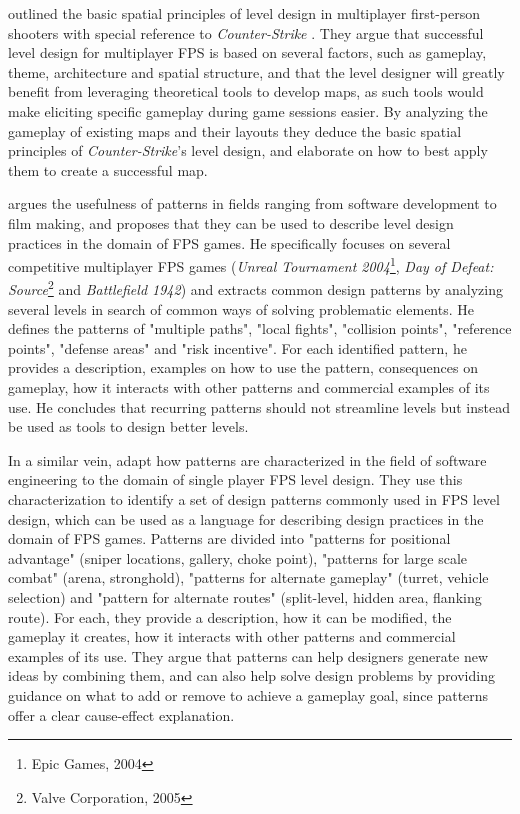 \documentclass{Configuration_Files/PoliMi3i_thesis}
\begin{document}
 outlined the basic spatial principles of level design in multiplayer first-person shooters with special reference to \textit{Counter-Strike} \cite{guttler_spatial_2003}. They argue  that successful level design for multiplayer FPS is based on several factors, such as gameplay, theme, architecture and spatial structure, and that the level designer will greatly benefit from leveraging theoretical tools to develop maps, as such tools would make  eliciting specific gameplay during game sessions easier. By analyzing the gameplay of existing maps and their layouts they deduce the basic spatial principles of \textit{Counter-Strike}'s level design, and elaborate on how to best apply them to create a successful map. 

 argues the usefulness of patterns in fields ranging from software development to film making, and proposes that they can be used to describe level design practices in the domain of FPS games. He specifically focuses on several competitive multiplayer FPS games (\textit{Unreal Tournament 2004}\footnote{Epic Games, 2004}, \textit{Day of Defeat: Source}\footnote{Valve Corporation, 2005} and \textit{Battlefield 1942}) and extracts common design patterns by analyzing several levels in search of common ways of solving problematic elements. He defines the patterns of "multiple paths", "local fights", "collision points", "reference points", "defense areas" and "risk incentive". For each identified pattern, he provides a description, examples on how to use the pattern, consequences on gameplay, how it interacts with other patterns and commercial examples of its use. He concludes that recurring patterns should not streamline levels but instead be used as tools to design better levels. \cite{larsen_level_2006}

In a similar vein,  adapt how patterns are characterized in the field of software engineering to the domain of single player FPS level design. They use this characterization to identify a set of design patterns commonly used in FPS level design, which can be used as a language for describing design practices in the domain of FPS games. Patterns are divided into "patterns for positional advantage" (sniper locations, gallery, choke point), "patterns for large scale combat" (arena, stronghold), "patterns for alternate gameplay" (turret, vehicle selection) and "pattern for alternate routes" (split-level, hidden area, flanking route). For each, they provide a description, how it can be modified, the gameplay it creates, how it interacts with other patterns and commercial examples of its use. 
They argue that patterns can help designers generate new ideas by combining them, and can also help solve design problems by providing guidance on what to add or remove to achieve a gameplay goal, since patterns offer a clear cause-effect explanation. \cite{hullett_design_2010}
\end{document}
